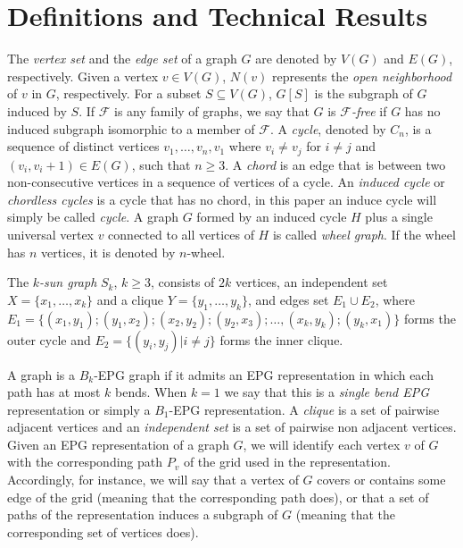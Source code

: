 \section{Definitions and Technical Results}

The \textit{vertex set} and the \textit{edge set} of a graph $G$ are denoted by $V(G)$ and $E(G)$, respectively.  Given a vertex $v\in V(G)$,  $N(v)$ represents the \textit{open 
 neighborhood} of $v$ in $G$, respectively. 
For a subset $S \subseteq V(G)$,  $G[S]$ is the subgraph of $G$ induced by $S$.
 If $\mathcal{F}$ is any family of graphs, we say that  $G$ is  \textit{$\mathcal{F}$-free} if $G$ has no induced subgraph isomorphic to a member of $\mathcal{F}$.
 A \textit{cycle},  denoted by $C_n$,  is a sequence of distinct
vertices $v_1, \dots , v_n, v_1$  where $v_i \neq v_j$ for $i \neq j$ and $(v_i, v_i + 1) \in E(G)$, such that
$n \geq 3$. A \textit{chord} is an edge that is between two non-consecutive vertices in a sequence of vertices of a cycle. An \textit{induced cycle}  or \textit{chordless cycles} is a cycle that has no chord, in this paper an induce cycle will simply be called  \textit{cycle}. A graph $G$ formed by an induced cycle $H$ plus  a single universal vertex $v$ connected to all vertices of $H$
is called \textit{wheel graph}. If the wheel has $n$ vertices, it is denoted by $n$-wheel. 

The $k$\textit{-sun graph }$S_k$, $k \geq 3$, consists of
$2k$ vertices, an independent set $X = \{x_1, \dots, x_k\}$ and a clique $Y = \{y_1, \dots, y_k\}$, and edges set $E_1 \cup E_2$, where $E_ 1=\{ (x_1,y_1); (y_1, x_2); (x_2, y_2); (y_2, x_3); \dots , (x_k, y_k); (y_k, x_1) \}$ forms the outer cycle and $E_2= \{(y_i, y_j) |i\neq j\}$ forms the inner clique.

A graph is a $ B_k$-EPG graph if it admits an EPG representation in which each path has at most $k$ bends.  When $ k = 1 $ we say that this is a \emph{single bend EPG} representation or simply a $B_1$-EPG representation.
A \textit{clique} is a set of pairwise adjacent vertices and
an \textit{independent set} is a set of pairwise non adjacent vertices.
Given an EPG representation of a graph $G$, we will identify each vertex $v$ of $G$ with the corresponding path $P_{v}$ of the grid used in the representation. Accordingly, for instance, we will say that a vertex of $G$ covers or contains some edge of the grid (meaning that the corresponding path does), or that a set of paths of the representation
induces a subgraph of $G$ (meaning that the corresponding set of vertices does). 

